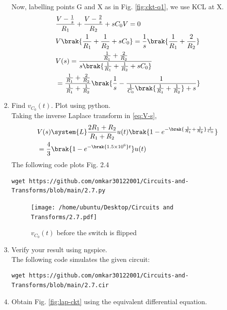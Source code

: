 \documentclass[journal,12pt,twocolumn]{IEEEtran}
\renewcommand\thesection{\arabic{section}}
\begin{document}
\begin{enumerate}[label=\arabic*.,ref=\thesection.\theenumi]
\begin{align}
\end{align}
Now, labelling points G and X as in Fig. \ref{fig:ckt-q1}, we use KCL at X.
\begin{align}
	&\frac{V - \frac{1}{s}}{R_1} + \frac{V - \frac{2}{s}}{R_2} + sC_0V = 0 \\
	&V\brak{\frac{1}{R_1} + \frac{1}{R_2} + sC_0} = \frac{1}{s}\brak{\frac{1}{R_1} + \frac{2}{R_2}} \\
	&V(s) = \frac{\frac{1}{R_1} + \frac{2}{R_2}}{s\brak{\frac{1}{R_1} + \frac{1}{R_2} + sC_0}} \\
	&= \frac{\frac{1}{R_1} + \frac{2}{R_2}}{\frac{1}{R_1} + \frac{1}{R_2}}\brak{\frac{1}{s} - \frac{1}{\frac{1}{C_0}\brak{\frac{1}{R_1} + \frac{1}{R_2}} + s}} 
	\label{eq:V-s}
\end{align}
\item Find $v_{C_0}(t)$.  Plot using python. \\
\solution
Taking the inverse Laplace transform in \eqref{eq:V-s},
\begin{align}
	&V(s) \system{L} \frac{2R_1 + R_2}{R_1 + R_2}u(t)\brak{1 - e^{-\brak{\frac{1}{R_1} + \frac{1}{R_2}}\frac{t}{C_0}}} \\
	&= \frac{4}{3}\brak{1 - e^{-\brak{1.5 \times 10^6}t}}u(t)
\end{align}
The following code plots Fig. 2.4
\begin{lstlisting}
wget https://github.com/omkar30122001/Circuits-and-Transforms/blob/main/2.7.py
\end{lstlisting}
\begin{figure}[!htb]
	\texttt{[image: /home/ubuntu/Desktop/Circuits and Transforms/2.7.pdf]}
	\caption{$v_{C_0}(t)$ before the switch is flipped}
	\label{fig:v1-t}
\end{figure}
\item Verify your result using ngspice. \\
\solution
The following code simulates the given circuit:
\begin{lstlisting}
wget https://github.com/omkar30122001/Circuits-and-Transforms/blob/main/2.7.cir
\end{lstlisting}
\item Obtain Fig. 
\ref{fig:lap-ckt}
using the equivalent differential equation.
\end{enumerate}
\end{document}
